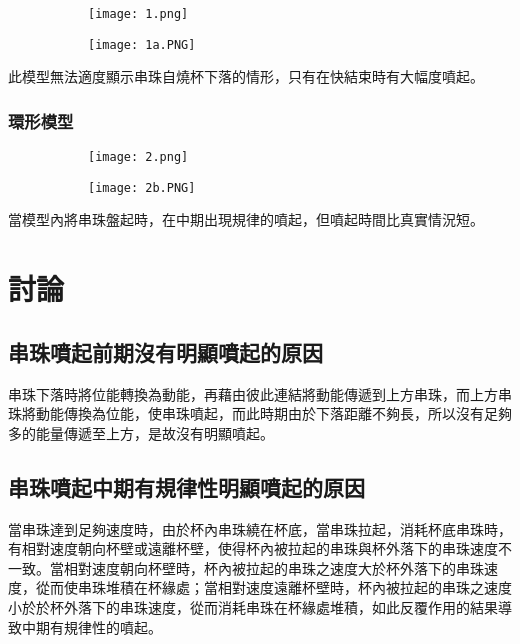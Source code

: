 \documentclass[11pt,twoside,b5paper]{article}
\begin{document}
\begin{figure}[H]
    \centering
    \begin{subfigure}[t]{0.3\linewidth}
    \texttt{[image: 1.png]}
    \end{subfigure}
    \begin{subfigure}[t]{0.65\linewidth}
    \texttt{[image: 1a.PNG]}
    \end{subfigure}
\end{figure}

此模型無法適度顯示串珠自燒杯下落的情形，只有在快結束時有大幅度噴起。

\subsubsection{環形模型}

\begin{figure}[H]
    \centering
    \begin{subfigure}[t]{0.3\linewidth}
    \texttt{[image: 2.png]}
    \end{subfigure}
    \begin{subfigure}[t]{0.65\linewidth}
    \texttt{[image: 2b.PNG]}
    \end{subfigure}
\end{figure}

當模型內將串珠盤起時，在中期出現規律的噴起，但噴起時間比真實情況短。

\section{討論}

\subsection{串珠噴起前期沒有明顯噴起的原因}
串珠下落時將位能轉換為動能，再藉由彼此連結將動能傳遞到上方串珠，而上方串珠將動能傳換為位能，使串珠噴起，而此時期由於下落距離不夠長，所以沒有足夠多的能量傳遞至上方，是故沒有明顯噴起。

\subsection{串珠噴起中期有規律性明顯噴起的原因}
當串珠達到足夠速度時，由於杯內串珠繞在杯底，當串珠拉起，消耗杯底串珠時，有相對速度朝向杯壁或遠離杯壁，使得杯內被拉起的串珠與杯外落下的串珠速度不一致。當相對速度朝向杯壁時，杯內被拉起的串珠之速度大於杯外落下的串珠速度，從而使串珠堆積在杯緣處；當相對速度遠離杯壁時，杯內被拉起的串珠之速度小於於杯外落下的串珠速度，從而消耗串珠在杯緣處堆積，如此反覆作用的結果導致中期有規律性的噴起。
\end{document}
